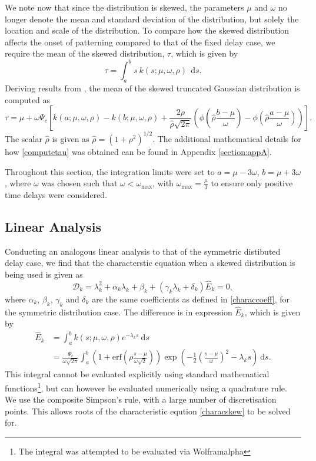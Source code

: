 We note now that since the distribution is skewed, the parameters $\mu$ and $\omega$ no longer denote the mean and standard deviation of the distribution, but solely the location and scale of the distribution. To compare how the skewed distribution affects the onset of patterning compared to that of the fixed delay case, we require the mean of the skewed distribution, $\tau$, which is given by
\begin{equation}\label{anmean}
    \tau=\int_a^bs\ k(s;\mu,\omega,\rho)\ \ \text{d}s.
\end{equation}
Deriving results from \cite{skewed}, the mean of the skewed truncated Gaussian distribution is computed as
\begin{equation}\label{computetau}
\tau=\mu+\omega\Psi_c\left[k(a;\mu,\omega,\rho)-k(b;\mu,\omega,\rho)+\frac{2\rho}{\hat{\rho}\sqrt{2\pi}}\left(\phi\left(\hat{\rho}\frac{b-\mu}{\omega}\right)-\phi\left(\hat{\rho}\frac{a-\mu}{\omega}\right)\right)\right].
\end{equation}
The scalar $\hat{\rho}$ is given as $\hat{\rho}=\left(1+\rho^2\right)^{1/2}$. The additional mathematical details for how \eqref{computetau} was obtained can be found in Appendix \ref{section:appA}.

Throughout this section, the integration limits were set to $a=\mu-3\omega$, $b=\mu+3\omega$, where $\omega$ was chosen such that $\omega<\omega_{\max}$, with $\omega_{\max}=\frac{\mu}{3}$ to ensure only positive time delays were considered.
\subsection{Linear Analysis}\label{section:linanalskew}
Conducting an analogous linear analysis to that of the symmetric distibuted delay case, we find that the characterstic equation when a skewed distribution is being used is given as
\begin{equation}\label{characskew}
  \mathcal{D}_k=\lambda_k^2+\alpha_k\lambda_k+\beta_k+(\gamma_k\lambda_k+\delta_k)\hat{E}_k=0,
\end{equation}
where $\alpha_k$, $\beta_k$, $\gamma_k$ and $\delta_k$ are the same coefficients as defined in \eqref{characcoeff}, for the symmetric distribution case. The difference is in expression $\hat{E}_k$, which is given by
\begin{equation}\label{Ehat}
    \begin{split}
\hat{E}_k&=\int_a^bk(s;\mu,\omega,\rho)e^{-\lambda_k s}\ \text{d}s\\
&=\frac{\Psi_c}{\omega\sqrt{2\pi}}\int_a^b\left(1+\text{erf}\left(\rho\frac{s-\mu}{\omega\sqrt{2}}\right)\right)\exp\left(-\frac{1}{2}\left(\frac{s-\mu}{\omega}\right)^2-\lambda_ks\right)\ \text{d}s.
    \end{split}
\end{equation}
This integral cannot be evaluated explicitly using standard mathematical functions\footnote{The integral was attempted to be evaluated via Wolframalpha}, but can however be evaluated numerically using a quadrature rule. We use the composite Simpson's rule, with a large number of discretisation points. This allows roots of the characteristic eqution \eqref{characskew} to be solved for.

